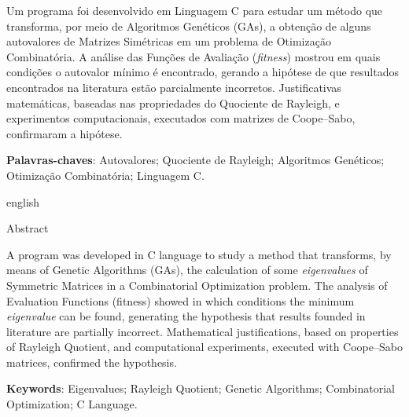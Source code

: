 \thispagestyle{empty}
\begin{resumo}
Um programa foi desenvolvido em Linguagem C para estudar um método que transforma, por meio de Algoritmos Genéticos (GAs), a obtenção de alguns autovalores de Matrizes Simétricas em um problema de Otimização Combinatória. A análise das Funções de Avaliação (\emph{fitness}) mostrou em quais condições o autovalor mínimo é encontrado, gerando a hipótese de que resultados encontrados na literatura estão parcialmente incorretos. Justificativas matemáticas, baseadas nas propriedades do Quociente de Rayleigh, e experimentos computacionais, executados com matrizes de Coope--Sabo, confirmaram a hipótese.
     
    \vspace{\onelineskip}

    \noindent\textbf{Palavras-chaves}: Autovalores; Quociente de Rayleigh; Algoritmos Genéticos; Otimização Combinatória; Linguagem C.

    \vspace{\onelineskip}
    \vspace{\onelineskip}
		
    \begin{otherlanguage*}{english}
    \begin{center}{\ABNTEXchapterfont\huge Abstract}\end{center}
    
    A program was developed in C language to study a method that transforms, by means of Genetic Algorithms (GAs), the calculation of some \emph{eigenvalues} of Symmetric Matrices in a Combinatorial Optimization problem. The analysis of Evaluation Functions (fitness) showed in which conditions the minimum \emph{eigenvalue} can be found, generating the hypothesis that results founded in literature are partially incorrect. Mathematical justifications, based on properties of Rayleigh Quotient, and computational experiments, executed with Coope--Sabo matrices, confirmed the hypothesis.
		
    \vspace{\onelineskip}

    \noindent\textbf{Keywords}: Eigenvalues; Rayleigh Quotient; Genetic Algorithms; Combinatorial Optimization; C Language.

    \end{otherlanguage*}
		
    


		
\end{resumo}

